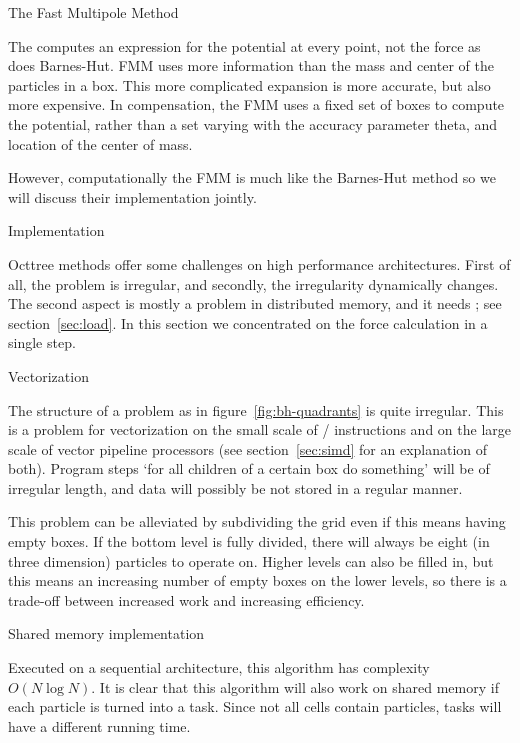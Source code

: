 
 {The Fast Multipole Method}

The  computes an expression for the potential at every point,
not the force as does Barnes-Hut.  \ac{FMM} uses more information than the
mass and center of the particles in a box. This more complicated
expansion is more accurate, but also more expensive. In compensation,
the FMM uses a fixed set of boxes to compute the potential, rather
than a set varying with the accuracy parameter theta, and location of
the center of mass.

However, computationally the \ac{FMM} is much like the Barnes-Hut
method so we will discuss their implementation jointly.

 {Implementation}

Octtree methods offer some challenges on high performance
architectures. First of all, the problem is irregular, and secondly,
the irregularity dynamically changes. The second aspect is mostly a
problem in distributed memory, and it
needs ; see section~\ref{sec:load}. In
this section we concentrated on the force calculation in a single
step.

 {Vectorization}

The structure of a problem as in figure~\ref{fig:bh-quadrants} is
quite irregular. This is a problem for vectorization on the small
scale of / instructions and on the large
scale of vector pipeline processors (see section~\ref{sec:simd} for an
explanation of both). Program steps `for all children of a certain box
do something' will be of irregular length, and data will possibly be
not stored in a regular manner.

This problem can be alleviated by subdividing the grid even if this
means having empty boxes. If the bottom level is fully divided, there
will always be eight (in three dimension) particles to operate
on. Higher levels can also be filled in, but this means an increasing
number of empty boxes on the lower levels, so there is a trade-off
between increased work and increasing efficiency.

 {Shared memory implementation}

Executed on a sequential architecture, this algorithm has complexity
$O(N\log N)$. It is clear that this algorithm will also work on shared
memory if each particle is turned into a task. Since not all cells
contain particles, tasks will have a different running time.

